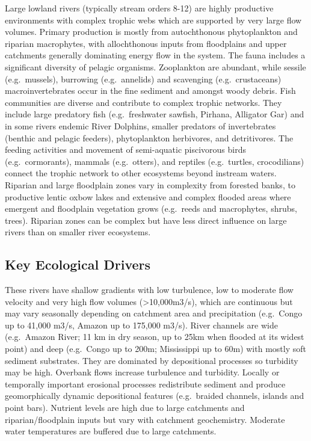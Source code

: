 \documentclass[
  letterpaper,
  DIV=11,
  numbers=noendperiod]{scrartcl}
\begin{document}
Large lowland rivers (typically stream orders 8-12) are highly
productive environments with complex trophic webs which are supported by
very large flow volumes. Primary production is mostly from autochthonous
phytoplankton and riparian macrophytes, with allochthonous inputs from
floodplains and upper catchments generally dominating energy flow in the
system. The fauna includes a significant diversity of pelagic organisms.
Zooplankton are abundant, while sessile (e.g.~mussels), burrowing
(e.g.~annelids) and scavenging (e.g.~crustaceans) macroinvertebrates
occur in the fine sediment and amongst woody debris. Fish communities
are diverse and contribute to complex trophic networks. They include
large predatory fish (e.g.~freshwater sawfish, Pirhana, Alligator Gar)
and in some rivers endemic River Dolphins, smaller predators of
invertebrates (benthic and pelagic feeders), phytoplankton herbivores,
and detritivores. The feeding activities and movement of semi-aquatic
piscivorous birds (e.g.~cormorants), mammals (e.g.~otters), and reptiles
(e.g.~turtles, crocodilians) connect the trophic network to other
ecosystems beyond instream waters. Riparian and large floodplain zones
vary in complexity from forested banks, to productive lentic oxbow lakes
and extensive and complex flooded areas where emergent and floodplain
vegetation grows (e.g.~reeds and macrophytes, shrubs, trees). Riparian
zones can be complex but have less direct influence on large rivers than
on smaller river ecosystems.

\subsection{Key Ecological Drivers}\label{key-ecological-drivers-115}

These rivers have shallow gradients with low turbulence, low to moderate
flow velocity and very high flow volumes (\textgreater10,000m3/s), which
are continuous but may vary seasonally depending on catchment area and
precipitation (e.g.~Congo up to 41,000 m3/s, Amazon up to 175,000 m3/s).
River channels are wide (e.g.~Amazon River; 11 km in dry season, up to
25km when flooded at its widest point) and deep (e.g.~Congo up to 200m;
Mississippi up to 60m) with mostly soft sediment substrates. They are
dominated by depositional processes so turbidity may be high. Overbank
flows increase turbulence and turbidity. Locally or temporally important
erosional processes redistribute sediment and produce geomorphically
dynamic depositional features (e.g.~braided channels, islands and point
bars). Nutrient levels are high due to large catchments and
riparian/floodplain inputs but vary with catchment geochemistry.
Moderate water temperatures are buffered due to large catchments.
\end{document}
